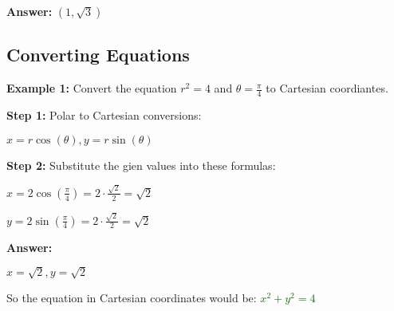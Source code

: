 \documentclass[10pt]{article}                               %
\begin{document}
\begin{adjustwidth}{2em}{0pt}
\begin{adjustwidth}{2em}{0pt}
\begin{examplebox}
\begin{adjustwidth}{2em}{0pt}
                \textbf{Answer:} \( \left(1,\sqrt{3}\right) \)

            \end{adjustwidth}

        \end{examplebox}

        \begin{examplebox}
        
            \subsection*{Converting Equations}

            \textbf{Example 1:} Convert the equation \( r^2 = 4 \) and \( \theta = \frac{\pi}{4} \) to Cartesian coordiantes.
            \vspace{0.5em}

            \begin{adjustwidth}{2em}{0pt}

                \textbf{Step 1:} Polar to Cartesian conversions:

                \vspace{0.25em}

                \( x = r\cos(\theta), y = r\sin(\theta) \)

                \vspace{0.5em}

                \textbf{Step 2:} Substitute the gien values into these formulas:

                \vspace{0.25em}

                \( x = 2\cos\left(\frac{\pi}{4}\right) = 2 \cdot \frac{\sqrt{2}}{2} = \sqrt{2} \)

                \( y = 2\sin\left(\frac{\pi}{4}\right) = 2 \cdot \frac{\sqrt{2}}{2} = \sqrt{2} \)

                \vspace{0.5em}

                \textbf{Answer:}

                \vspace{0.25em}

                \( x = \sqrt{2}, y = \sqrt{2} \)

                \vspace{0.5em}

                So the equation in Cartesian coordinates would be:
                \textcolor{darkgreen}{\( x^2 + y^2 = 4 \)}


\end{adjustwidth}
\end{examplebox}
\end{adjustwidth}
\end{adjustwidth}
\end{document}

